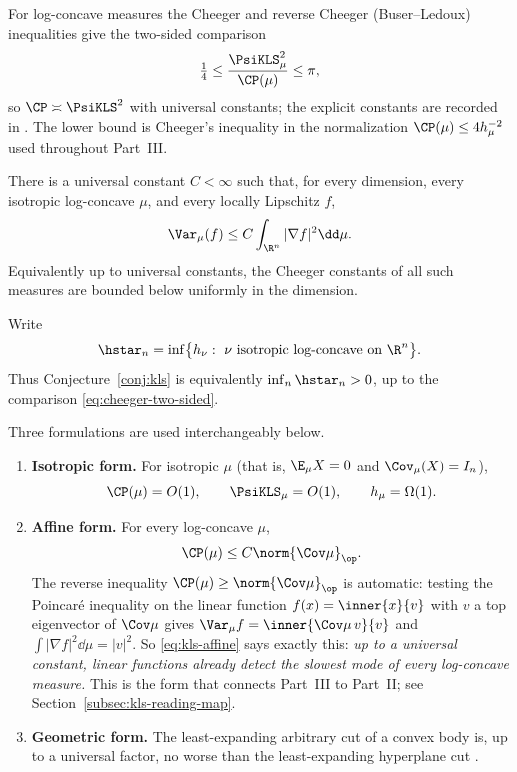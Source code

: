 \documentclass[../../main.tex]{subfiles}
\begin{document}
For log-concave measures the Cheeger and reverse Cheeger (Buser--Ledoux) inequalities give the
two-sided comparison
\begin{equation}
  \tfrac14\le\frac{\PsiKLS_\mu^2}{\CP(\mu)}\le\pi ,
  \label{eq:cheeger-two-sided}
\end{equation}
so $\CP\asymp\PsiKLS^2$ with universal constants; the explicit constants are recorded in
\cite{Klartag2023Logarithmic,Milman2009Isoperimetric}. The lower bound is Cheeger's inequality in
the normalization $\CP(\mu)\le4h_\mu^{-2}$ used throughout Part~III.

\begin{conjecture}[KLS]
\label{conj:kls}
There is a universal constant $C<\infty$ such that, for every dimension, every isotropic
log-concave $\mu$, and every locally Lipschitz $f$,
\[
  \Var_\mu(f)\le C\int_{\R^n}|\nabla f|^2\dd\mu.
\]
Equivalently up to universal constants, the Cheeger constants of all such measures are bounded
below uniformly in the dimension.
\end{conjecture}

Write
\begin{equation}
  \hstar_n=\inf\bigl\{h_\nu:\ \nu\ \text{isotropic log-concave on }\R^n\bigr\}.
  \label{eq:hstar-def}
\end{equation}
Thus Conjecture~\ref{conj:kls} is equivalently $\inf_n\hstar_n>0$, up to the comparison
\eqref{eq:cheeger-two-sided}.

Three formulations are used interchangeably below.

\begin{enumerate}[label=(\alph*),leftmargin=2.2em]
  \item \textbf{Isotropic form.} For isotropic $\mu$ (that is, $\E_\mu X=0$ and $\Cov_\mu(X)=I_n$),
  \[
    \CP(\mu)=O(1),\qquad \PsiKLS_\mu=O(1),\qquad h_\mu=\Omega(1).
  \]

  \item \textbf{Affine form.} For every log-concave $\mu$,
  \begin{equation}
    \CP(\mu)\le C\norm{\Cov\mu}_\op .
    \label{eq:kls-affine}
  \end{equation}
  The reverse inequality $\CP(\mu)\ge\norm{\Cov\mu}_\op$ is automatic: testing the Poincar\'e
  inequality on the linear function $f(x)=\inner{x}{v}$ with $v$ a top eigenvector of $\Cov\mu$
  gives $\Var_\mu f=\inner{\Cov\mu\,v}{v}$ and $\int|\nabla f|^2\dd\mu=|v|^2$. So
  \eqref{eq:kls-affine} says exactly this: \emph{up to a universal constant, linear functions
  already detect the slowest mode of every log-concave measure.} This is the form that connects
  Part~III to Part~II; see Section~\ref{subsec:kls-reading-map}.

  \item \textbf{Geometric form.} The least-expanding arbitrary cut of a convex body is, up to a
  universal factor, no worse than the least-expanding hyperplane cut
  \cite{KannanLovaszSimonovits1995}.
\end{enumerate}
\end{document}
